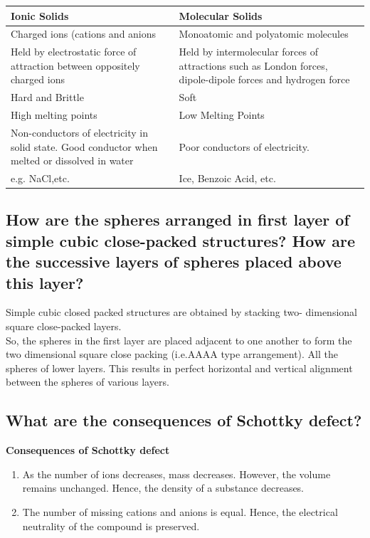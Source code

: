 \documentclass{article}
\begin{document}
   \begin{center}
   \begin{tabular}{ | m{20em} | m{20em} | }
   \hline
   \textbf{Ionic Solids} & \textbf{Molecular Solids} \\
   \hline
   Charged ions (cations and anions & Monoatomic and polyatomic
   molecules \\
   \hline
   Held by electrostatic force of attraction between oppositely
   charged ions & Held by intermolecular forces of attractions 
   such as London forces, dipole-dipole forces and hydrogen force \\
   \hline
   Hard and Brittle & Soft \\
   \hline
   High melting points & Low Melting Points \\
   \hline
   Non-conductors of electricity in solid state. Good conductor when
   melted or dissolved in water & Poor conductors of electricity. \\
   \hline
   e.g. NaCl,etc. & Ice, Benzoic Acid, etc. \\
   \hline
   \end{tabular}
   \end{center}

   \subsection{How are the spheres arranged in first layer of simple
   cubic close-packed structures? How are the successive layers of
   spheres placed above this layer?}

   Simple cubic closed packed structures are obtained by stacking two-
   dimensional square close-packed layers.\\
   So, the spheres in the first layer are placed adjacent to one another
   to form the two dimensional square close packing (i.e.AAAA type
   arrangement). All the spheres of lower layers. This results in
   perfect horizontal and vertical alignment between the spheres of
   various layers.

   \subsection{What are the consequences of Schottky defect?}

   \textbf{Consequences of Schottky defect}
   \begin{enumerate}
	\item As the number of ions decreases, mass decreases. 
	However, the volume remains unchanged. Hence, the density of
	a substance decreases.
	\item The number of missing cations and anions is equal.
	Hence, the electrical neutrality of the compound is preserved.
   \end{enumerate}
\end{document}
